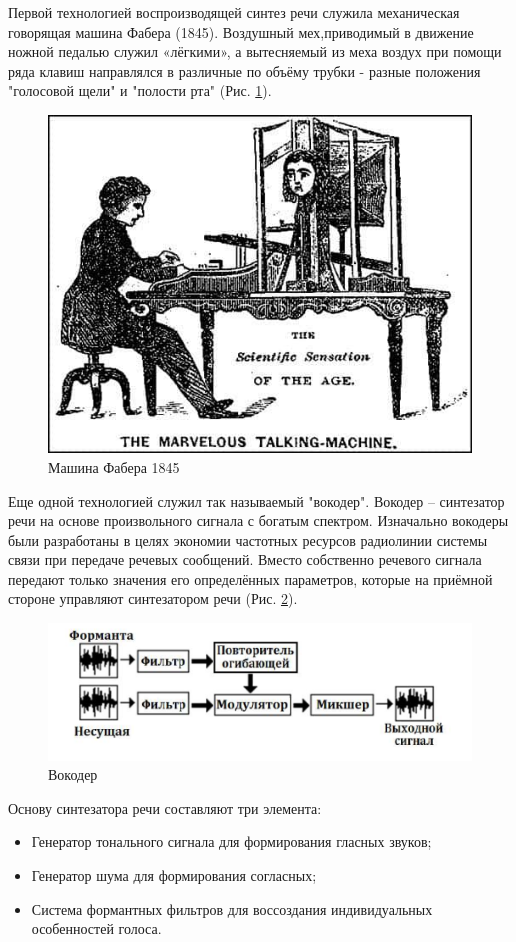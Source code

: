 Первой технологией воспроизводящей синтез речи служила механическая говорящая машина Фабера (1845).
Воздушный мех,приводимый в движение ножной педалью служил «лёгкими», а вытесняемый из меха
воздух при помощи ряда клавиш направлялся в различные по объёму трубки - разные положения "голосовой щели" и "полости рта" (Рис. \ref{pic:faber_machine.png}).


\begin{figure}[h]
	\includegraphics[width=0.75\columnwidth]{./img/faber_machine.png}
	\centering
	\caption{Машина Фабера 1845}
	\label{pic:faber_machine.png}
	\end{figure}

Еще одной технологией служил так называемый "вокодер".  
Вокодер – синтезатор речи на основе
произвольного сигнала с богатым спектром.
Изначально вокодеры были разработаны в целях
экономии частотных ресурсов радиолинии
системы связи при передаче речевых сообщений.
Вместо собственно речевого сигнала передают
только значения его определённых параметров,
которые на приёмной стороне управляют
синтезатором речи (Рис. \ref{pic:vocoder.png}).


\begin{figure}[h]
\includegraphics[width=0.75\columnwidth]{./img/vocoder.png}
\centering
\caption{Вокодер}
\label{pic:vocoder.png}
\end{figure}

Основу синтезатора речи составляют три
элемента:
\begin{itemize}
	\item Генератор тонального сигнала для формирования гласных звуков;
	\item Генератор шума для формирования согласных;
	\item Система формантных фильтров для воссоздания
	индивидуальных особенностей голоса.
\end{itemize}

